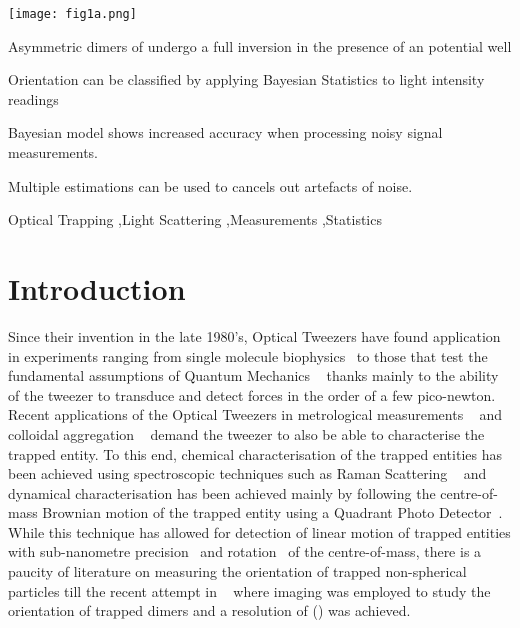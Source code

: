 \documentclass[review,3p]{elsarticle}
\begin{document}
\begin{frontmatter}
\begin{abstract}
\end{abstract}

\begin{graphicalabstract}
	\centering
	\texttt{[image: fig1a.png]}
\end{graphicalabstract}

\begin{highlights}
\item Asymmetric dimers of undergo a full inversion in the presence of an potential well
\item Orientation can be classified by applying Bayesian Statistics to light intensity readings
\item Bayesian model shows increased accuracy when processing noisy signal measurements. 
\item Multiple estimations can be  used to cancels out artefacts of noise. 
\end{highlights}

\begin{keyword}
	Optical Trapping \sep Light Scattering \sep Measurements \sep Statistics

\end{keyword}

\end{frontmatter}


\section{Introduction}
\label{1}

Since their invention in the late 1980's, Optical Tweezers have found application in experiments ranging from single molecule biophysics~\cite{Wang 2021} to those that test the fundamental assumptions of Quantum Mechanics ~\cite{Duan 2013} thanks mainly to the ability of the tweezer to transduce and detect forces in the order of a few pico-newton. Recent applications of the Optical Tweezers in metrological measurements ~\cite{Scott Waitukaitis} and colloidal aggregation ~\cite{Optical Binding} demand the tweezer to also be able to characterise  the trapped entity. To this end, chemical characterisation of the trapped entities has been achieved using spectroscopic techniques such as Raman Scattering ~\cite{P K Gupta} and dynamical characterisation has been achieved mainly by following the centre-of-mass Brownian motion of the trapped entity using a Quadrant Photo Detector~\cite{Alexander Rohrbach}. While this technique has allowed for detection of linear motion of trapped entities  with sub-nanometre precision~\cite{Alexander Rohrbach} and  rotation~\cite{recent paper} of the centre-of-mass, there is a paucity of literature on measuring the orientation of trapped non-spherical particles till the recent attempt in ~\cite{New Zealand paper} where imaging was employed to study the orientation of trapped dimers and a resolution of () was achieved.   
\end{document}
